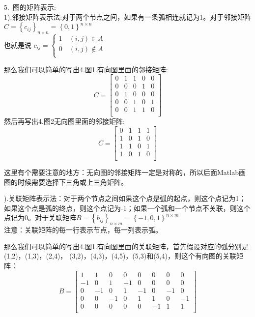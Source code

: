 \documentclass[a4paper,20pt]{article}
\begin{document}
\par 5.~图的矩阵表示:
\\1).邻接矩阵表示法:对于两个节点之间，如果有一条弧相连就记为1。对于邻接矩阵$C=\left\{c_{ij}\right\}_{n \times n}=\left\{0,1\right\}^{n\times n}$
\\也就是说 $c_{ij}=\left\{\begin{matrix}
        1\quad (i,j)\in A    \\
        0\quad (i,j)\notin A \\
    \end{matrix}\right.$
\par 那么我们可以简单的写出4.图1.有向图里面的邻接矩阵:
$$C=
    \begin{bmatrix}
        0 & 1 & 1 & 0 & 0 \\
        0 & 0 & 0 & 1 & 0 \\
        0 & 1 & 0 & 0 & 0 \\
        0 & 0 & 1 & 0 & 1 \\
        0 & 0 & 1 & 1 & 0 \\
    \end{bmatrix} $$
然后再写出4.图2无向图里面的邻接矩阵:
$$C=
    \begin{bmatrix}
        0 & 1 & 1 & 1 \\
        1 & 0 & 1 & 0 \\
        1 & 1 & 0 & 1 \\
        1 & 0 & 1 & 0 \\
    \end{bmatrix}$$
\par \noindent 这里有个需要注意的地方：无向图的邻接矩阵一定是对称的，所以后面Matlab画图的时候需要选择下三角或上三角矩阵。
\par {}).关联矩阵表示法：对于两个节点之间如果这个点是弧的起点，则这个点记为1；
如果这个点是弧的终点，则这个点记为-1；如果一个弧和一个节点不关联，则这个点记为0。对于关联矩阵$B=\left\{b_{ij}\right\}_{n\times m}=\left\{-1,0,1\right\}^{n\times m}$
\\注意：关联矩阵的每一行表示节点，每一列表示弧。
\par 那么我们可以简单的写出4.图1.有向图里面的关联矩阵，首先假设对应的弧分别是(1,2)，(1,3)，(2,4)，
(3,2)，(4,3)，(4,5)，(5,3)和(5,4)，则这个有向图的关联矩阵：
$$B=\begin{bmatrix}
        1  & 1  & 0  & 0  & 0  & 0  & 0  & 0  \\
        -1 & 0  & 1  & -1 & 0  & 0  & 0  & 0  \\
        0  & -1 & 0  & 1  & -1 & 0  & -1 & 0  \\
        0  & 0  & -1 & 0  & 1  & 1  & 0  & -1 \\
        0  & 0  & 0  & 0  & 0  & -1 & 1  & 1  \\
    \end{bmatrix}$$
\end{document}
